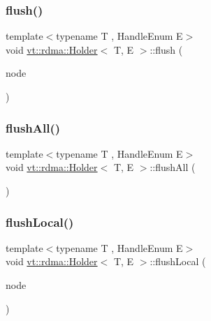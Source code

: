 \mbox{\label{structvt_1_1rdma_1_1_holder_af2bb524d70bdaa0eaad2a394c0e9b633}} 
\subsubsection{\texorpdfstring{flush()}{flush()}}
{\footnotesize\ttfamily template$<$typename T , Handle\+Enum E$>$ \\
void \hyperlink{structvt_1_1rdma_1_1_holder}{vt\+::rdma\+::\+Holder}$<$ T, E $>$\+::flush (\begin{DoxyParamCaption}\item[{\hyperlink{namespacevt_a866da9d0efc19c0a1ce79e9e492f47e2}{vt\+::\+Node\+Type}}]{node }\end{DoxyParamCaption})}

\mbox{\label{structvt_1_1rdma_1_1_holder_a667a140d3db4f68da8af0f9d6533a88a}} 
\subsubsection{\texorpdfstring{flush\+All()}{flushAll()}}
{\footnotesize\ttfamily template$<$typename T , Handle\+Enum E$>$ \\
void \hyperlink{structvt_1_1rdma_1_1_holder}{vt\+::rdma\+::\+Holder}$<$ T, E $>$\+::flush\+All (\begin{DoxyParamCaption}{ }\end{DoxyParamCaption})}

\mbox{\label{structvt_1_1rdma_1_1_holder_a4b576d334034884d7c72b89310fd4f57}} 
\subsubsection{\texorpdfstring{flush\+Local()}{flushLocal()}}
{\footnotesize\ttfamily template$<$typename T , Handle\+Enum E$>$ \\
void \hyperlink{structvt_1_1rdma_1_1_holder}{vt\+::rdma\+::\+Holder}$<$ T, E $>$\+::flush\+Local (\begin{DoxyParamCaption}\item[{\hyperlink{namespacevt_a866da9d0efc19c0a1ce79e9e492f47e2}{vt\+::\+Node\+Type}}]{node }\end{DoxyParamCaption})}

